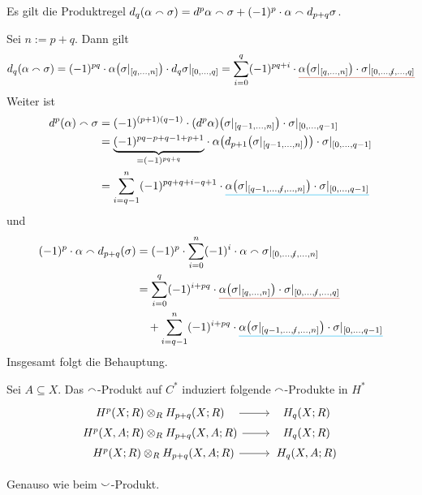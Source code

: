 \begin{lemma}[{name=[Produktregel für das Cap-Produkt]},label=lem:cap_prod]
	Es gilt die Produktregel $d_q(\alpha \smallfrown \sigma) = d^p \alpha \smallfrown \sigma + (-1)^p \cdot \alpha \smallfrown d_{p+q} \sigma$.
\end{lemma}
\begin{beweis}
	Sei $n := p+q$. Dann gilt
	\[
		d_q(\alpha \capp \sigma) = (-1)^{pq} \cdot \alpha \enbrace*{\sigma|_{\benbrace*{q,\ldots ,n}}} \cdot d_q \sigma|_{\benbrace*{0,\ldots ,q}} 
		= \sum_{i=0}^{q} (-1)^{pq+i} \cdot \mathul{Coral3}{\alpha \enbrace*{\sigma|_{\benbrace*{q,\ldots ,n}}}\cdot \sigma|_{\benbrace*{0, \ldots ,\slashedi,\ldots ,q}}}
	\]
	Weiter ist 
	\begin{align}
		d^p(\alpha) \capp \sigma &= (-1)^{(p+1)(q-1)} \cdot (d^p \alpha) \enbrace*{\sigma|_{\benbrace*{q-1,\ldots ,n}}} \cdot \sigma|_{\benbrace*{0,\ldots ,q-1}} \\
		&= \Underbrace{(-1)^{pq-p+q-1+p+1}}{=(-1)^{pq+q}} \cdot \alpha \enbrace*{ d_{p+1} \enbrace*{\sigma|_{\benbrace*{q-1,\ldots ,n}}}} \cdot \sigma|_{\benbrace*{0, \ldots ,q-1}} \\
		&= \sum_{i=q-1}^{n} (-1)^{pq+q+i-q+1} \cdot \mathul{DeepSkyBlue2}{\alpha \enbrace*{\sigma|_{\benbrace*{q-1,\ldots,\slashedi,\ldots ,n}}} \cdot \sigma|_{\benbrace*{0, \ldots ,q-1}}}
	\end{align}
	und
	\begin{align}
		(-1)^p \cdot \alpha \capp d_{p+q}(\sigma) &= (-1)^p \cdot \sum_{i=0}^{n} (-1)^i \cdot \alpha \capp \sigma |_{\benbrace*{0, \ldots , \slashedi,\ldots ,n}} \\
		&= \sum_{i=0}^{q} (-1)^{i+pq} \cdot \mathul{Coral3}{\alpha \enbrace*{\sigma|_{\benbrace*{q,\ldots ,n}}} \cdot \sigma|_{\benbrace*{0,\ldots , \slashedi,\ldots ,q}}}\\
		&\hspace{1em}+ \sum_{i=q-1}^{n} (-1)^{i+pq} \cdot \mathul{DeepSkyBlue2}{\alpha \enbrace*{\sigma|_{\benbrace*{q-1,\ldots,\slashedi,\ldots,n}}} \cdot \sigma|_{\benbrace*{0, \ldots ,q-1}}}
	\end{align}
	Insgesamt folgt die Behauptung.
\end{beweis}

\begin{lemma}[{name=[relative Cap-Produkte]}]
	Sei $A \subseteq X$. Das $\smallfrown$-Produkt auf $C^*$ induziert folgende $\smallfrown$-Produkte in $H^*$
	\[
		\begin{tikzcd}[row sep=0em]
			\minwidthbox{H^p(X;R) \otimes_R H_{p+q}(X;R)}{4.6cm} \rar & \minwidthbox{H_q(X;R)}{2cm} \\
			\minwidthbox{H^p(X,A;R) \otimes_R H_{p+q}(X,A;R)}{4.6cm} \rar & \minwidthbox{H_q(X;R)}{2cm} \\
			\minwidthbox{\hfill H^p(X;R) \otimes_R H_{p+q}(X,A;R)}{4.6cm} \rar & \minwidthbox{H_q(X,A;R)}{2cm}
		\end{tikzcd}
	\]
\end{lemma}
\begin{beweis}
	Genauso wie beim $\smallsmile$-Produkt.
\end{beweis}

